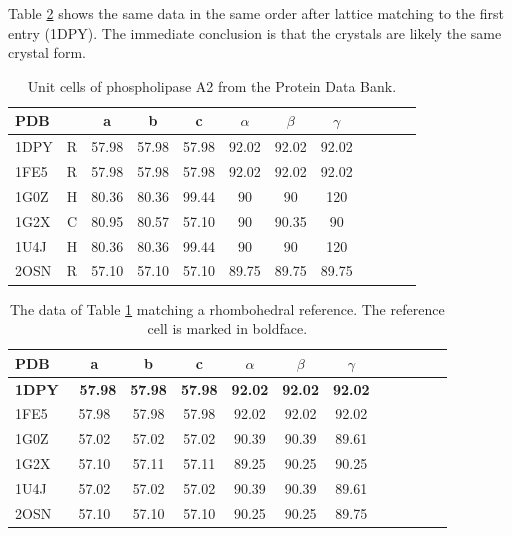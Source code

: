 \documentclass[preprint]{iucr}              %
\numberwithin{equation}{section}
\begin{document}
Table \ref{table:LT2} shows the same data in the same order after 
lattice matching to the first entry (1DPY). The immediate conclusion
is that the crystals are likely the same crystal form.

\begin{table}
	\begin{center}
		\caption{Unit cells of phospholipase A2 from the Protein Data Bank.}		
		\vspace{3mm}
		\begin{tabular}{lccccccccccc}
			\toprule
			PDB &   & a &b &c&$\alpha$&$\beta$&$\gamma$ \\
			\midrule
			1DPY &R& 57.98& 57.98 &57.98 &92.02  &92.02 &92.02 \\ 
			1FE5 &R& 57.98& 57.98 &57.98 &92.02  &92.02 &92.02 \\ 
			1G0Z &H& 80.36& 80.36 &99.44 &90     &90    &120   \\ 
			1G2X &C& 80.95& 80.57 &57.10 &90     &90.35 &90    \\ 
			1U4J &H& 80.36& 80.36 &99.44 &90     &90    &120   \\ 
			2OSN &R& 57.10 & 57.10  &57.10  &89.75  &89.75 &89.75  \\ 
			\bottomrule
		\end{tabular}
		\label{table:LT1}
	\end{center}
\end{table}	


\begin{table}
	\begin{center}
		\caption{The data of Table \ref{table:LT1} matching a rhombohedral reference. The 
			reference cell is marked in boldface.}
		\vspace{3mm}
		\begin{tabular}{lccccccccccc}
			\toprule
			PDB &   a & b & c & $\alpha$ & $\beta$ & $\gamma$ \\ \midrule
			\textbf{1DPY} & \ \textbf{57.98}  & \textbf{57.98}  & \textbf{57.98}  &
			\textbf{92.02}  & \textbf{92.02}  & \textbf{92.02}  \\ 
			1FE5 &57.98  &57.98  &57.98  &92.02 & 92.02  & 92.02  \\ 
			1G0Z &57.02  &57.02  &57.02  &90.39  &90.39 &89.61  \\
			1G2X &57.10  &57.11  &57.11  &89.25  &90.25  &90.25  \\
			1U4J &57.02  &57.02  &57.02  &90.39  &90.39  &89.61  \\ 
			2OSN &57.10  &57.10  &57.10  &90.25  &90.25  &89.75  \\ 
			\bottomrule
		\end{tabular}		
		\label{table:LT2}
	\end{center}
\end{table}	
\end{document}
